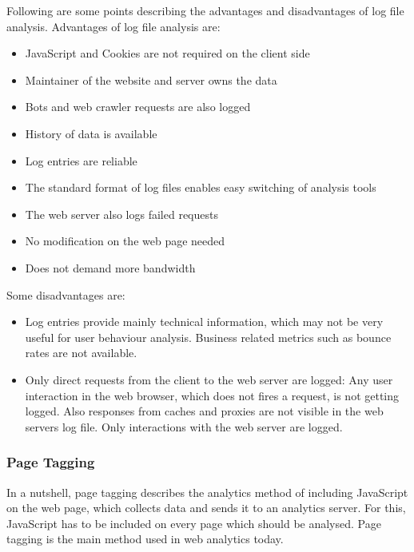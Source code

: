 Following are some points describing the advantages and disadvantages of log file analysis.
Advantages of log file analysis are:

\begin{itemize}
\item JavaScript and Cookies are not required on the client side
\item Maintainer of the website and server owns the data %
\item Bots and web crawler requests are also logged %
\item History of data is available %
\item Log entries are reliable %
\item The standard format of log files enables easy switching of analysis tools %
\item The web server also logs failed requests %
\item No modification on the web page needed %
\item Does not demand more bandwidth %
\end{itemize}


Some disadvantages are:

\begin{itemize}
\item Log entries provide mainly technical information, which may not be very useful for user behaviour analysis. Business related metrics such as bounce rates are not available. %
\item Only direct requests from the client to the web server are logged: Any user interaction in the web browser, which does not fires a request, is not getting logged. Also responses from caches and proxies are not visible in the web servers log file. Only interactions with the web server are logged.%
\end{itemize}





\subsubsection{Page Tagging}

In a nutshell, page tagging describes the analytics method of including JavaScript on the web page, which collects data and sends it to an analytics server. %
For this, JavaScript has to be included on every page which should be analysed. %
Page tagging is the main method used in web analytics today. %

